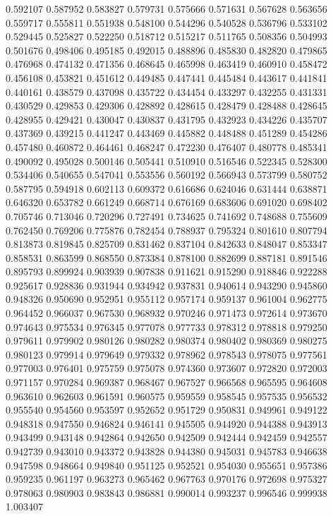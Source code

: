 0.592107
0.587952
0.583827
0.579731
0.575666
0.571631
0.567628
0.563656
0.559717
0.555811
0.551938
0.548100
0.544296
0.540528
0.536796
0.533102
0.529445
0.525827
0.522250
0.518712
0.515217
0.511765
0.508356
0.504993
0.501676
0.498406
0.495185
0.492015
0.488896
0.485830
0.482820
0.479865
0.476968
0.474132
0.471356
0.468645
0.465998
0.463419
0.460910
0.458472
0.456108
0.453821
0.451612
0.449485
0.447441
0.445484
0.443617
0.441841
0.440161
0.438579
0.437098
0.435722
0.434454
0.433297
0.432255
0.431331
0.430529
0.429853
0.429306
0.428892
0.428615
0.428479
0.428488
0.428645
0.428955
0.429421
0.430047
0.430837
0.431795
0.432923
0.434226
0.435707
0.437369
0.439215
0.441247
0.443469
0.445882
0.448488
0.451289
0.454286
0.457480
0.460872
0.464461
0.468247
0.472230
0.476407
0.480778
0.485341
0.490092
0.495028
0.500146
0.505441
0.510910
0.516546
0.522345
0.528300
0.534406
0.540655
0.547041
0.553556
0.560192
0.566943
0.573799
0.580752
0.587795
0.594918
0.602113
0.609372
0.616686
0.624046
0.631444
0.638871
0.646320
0.653782
0.661249
0.668714
0.676169
0.683606
0.691020
0.698402
0.705746
0.713046
0.720296
0.727491
0.734625
0.741692
0.748688
0.755609
0.762450
0.769206
0.775876
0.782454
0.788937
0.795324
0.801610
0.807794
0.813873
0.819845
0.825709
0.831462
0.837104
0.842633
0.848047
0.853347
0.858531
0.863599
0.868550
0.873384
0.878100
0.882699
0.887181
0.891546
0.895793
0.899924
0.903939
0.907838
0.911621
0.915290
0.918846
0.922288
0.925617
0.928836
0.931944
0.934942
0.937831
0.940614
0.943290
0.945860
0.948326
0.950690
0.952951
0.955112
0.957174
0.959137
0.961004
0.962775
0.964452
0.966037
0.967530
0.968932
0.970246
0.971473
0.972614
0.973670
0.974643
0.975534
0.976345
0.977078
0.977733
0.978312
0.978818
0.979250
0.979611
0.979902
0.980126
0.980282
0.980374
0.980402
0.980369
0.980275
0.980123
0.979914
0.979649
0.979332
0.978962
0.978543
0.978075
0.977561
0.977003
0.976401
0.975759
0.975078
0.974360
0.973607
0.972820
0.972003
0.971157
0.970284
0.969387
0.968467
0.967527
0.966568
0.965595
0.964608
0.963610
0.962603
0.961591
0.960575
0.959559
0.958545
0.957535
0.956532
0.955540
0.954560
0.953597
0.952652
0.951729
0.950831
0.949961
0.949122
0.948318
0.947550
0.946824
0.946141
0.945505
0.944920
0.944388
0.943913
0.943499
0.943148
0.942864
0.942650
0.942509
0.942444
0.942459
0.942557
0.942739
0.943010
0.943372
0.943828
0.944380
0.945031
0.945783
0.946638
0.947598
0.948664
0.949840
0.951125
0.952521
0.954030
0.955651
0.957386
0.959235
0.961197
0.963273
0.965462
0.967763
0.970176
0.972698
0.975327
0.978063
0.980903
0.983843
0.986881
0.990014
0.993237
0.996546
0.999938
1.003407
